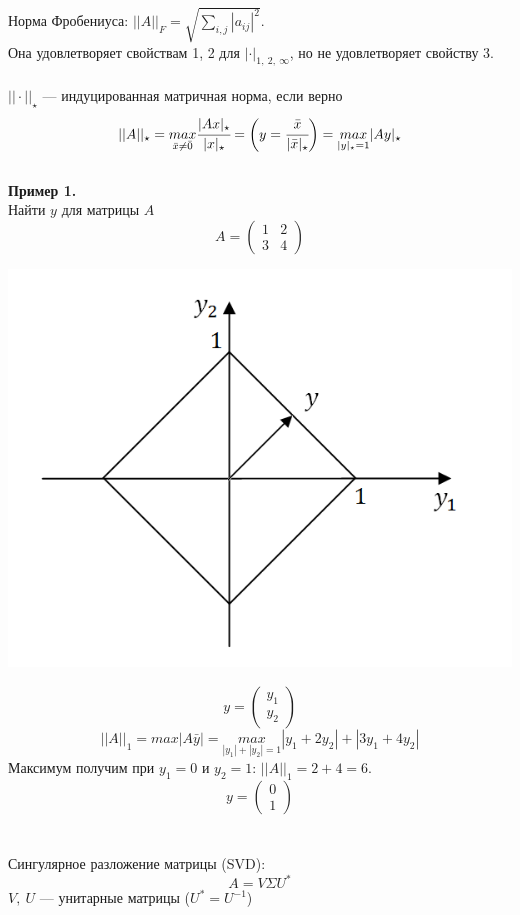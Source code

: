 \documentclass[12pt]{article}
\theoremstyle{definition}
\numberwithin{equation}{section}
\begin{document}
Норма Фробениуса: $||A||_F=\sqrt{\sum\limits_{i,j}|a_{ij}|^2}$.\\
Она удовлетворяет свойствам 1, 2 для $|\cdot|_{1,~2,~\infty}$, но не удовлетворяет свойству 3.\\
\\
$||\cdot||_{\star}$ --- индуцированная матричная норма, если верно $$||A||_{\star}=\underset{\bar x \neq \bar 0}{max} \cfrac{|Ax|_{\star}}{|x|_{\star}}=\bigg( y=\cfrac{\bar x}{|\bar x|_{\star}} \bigg)=\underset{|y|_{\star}=1}{max}|Ay|_{\star}$$
\\
\textbf{Пример 1.}\\
Найти $y$ для матрицы $A$ \[A=\begin{pmatrix}
1 & 2\\
3 & 4
\end{pmatrix}\]
\begin{center}
\includegraphics[scale=0.6]{l8_1.png}\end{center}
\[y=\begin{pmatrix}
y_1\\
y_2
\end{pmatrix}\]
$$||A||_1=max|A \bar y|=\underset{|y_1|+|y_2|=1}{max}|y_1+2y_2|+|3y_1+4y_2|$$
Максимум получим при $y_1=0$ и $y_2=1$: $||A||_1=2+4=6$.
\[y=\begin{pmatrix}
0\\
1
\end{pmatrix}\]
~\\ \\
Сингулярное разложение матрицы (SVD): $$A=V\Sigma U^*$$
$V, ~U$ --- унитарные матрицы ($U^*=U^{-1}$)
\end{document}
